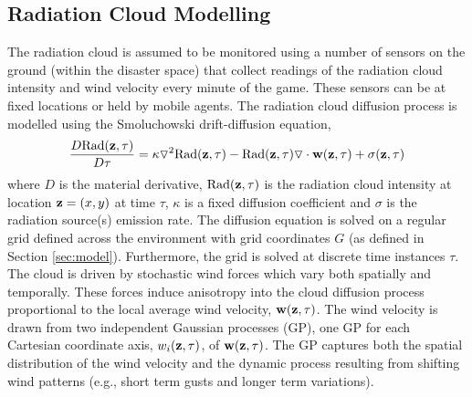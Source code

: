 \subsection{Radiation Cloud Modelling}\label{sec:radiation}
\noindent The radiation cloud is assumed to be monitored using a number of sensors on the ground (within the disaster space) that collect readings of the radiation cloud intensity and wind velocity every minute of the game. These sensors can be at fixed locations or held by mobile agents.  The radiation cloud diffusion process is modelled using the Smoluchowski drift-diffusion equation, 
\begin{eqnarray*}
\frac{D \text{Rad}({\bf z}, \tau)}{D \tau}=\kappa \triangledown^2 \text{Rad}({\bf z},\tau)-\text{Rad}({\bf z},\tau)\triangledown \cdot {\bf w}({\bf z},\tau)+\sigma({\bf z},\tau)
\end{eqnarray*}
where $D$ is the material derivative, $\text{Rad}({\bf z},\tau)$ is the radiation cloud intensity at location ${\bf z}=(x,y)$ at time $\tau$, $\kappa$ is a fixed diffusion coefficient and $\sigma$ is the radiation source(s) emission rate. The diffusion equation is solved on a regular grid defined across the environment with grid coordinates $G$ (as defined in Section \ref{sec:model}).  Furthermore, the grid is solved at discrete time instances $\tau$.  The cloud is driven by stochastic wind forces which vary both spatially and temporally.  These forces induce anisotropy into the cloud diffusion process  proportional to the local average wind velocity, ${\bf w}({\bf z},\tau)$.  The wind velocity is drawn from two independent Gaussian processes (GP), one GP for each Cartesian coordinate axis, $w_i({\bf z},\tau)$, of ${\bf w}({\bf z},\tau)$.  The GP captures both the spatial distribution of the wind velocity and the dynamic process resulting from shifting wind patterns (e.g., short term gusts and longer term variations). 


